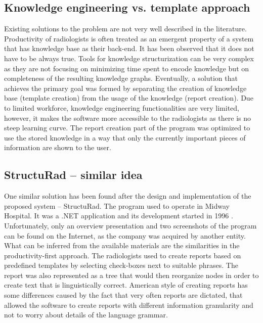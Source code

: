 \documentclass[12pt, twoside, openany]{report}
\theoremstyle{definition}
\begin{document}
\subsection{Knowledge engineering vs. template approach}
Existing solutions to the problem are not very well described in the literature. Productivity of radiologists is often treated as an emergent property of a system that has knowledge base as their back-end. It has been observed that it does not have to be always true. Tools for knowledge structurization can be very complex as they are not focusing on minimizing time spent to encode knowledge but on completeness of the resulting knowledge graphs. 
Eventually, a solution that achieves the primary goal was formed by separating the creation of knowledge base (template creation) from the usage of the knowledge (report creation). Due to limited workforce, knowledge engineering functionalities are very limited, however, it makes the software more accessible to the radiologists as there is no steep learning curve. The report creation part of the program was optimized to use the stored knowledge in a way that only the currently important pieces of information are shown to the user.
\subsection{StructuRad – similar idea} 
One similar solution has been found after the design and implementation of the proposed system – StructuRad. The program used to operate in Midway Hospital. It was a .NET application and its development started in 1996 \cite{structurad}. Unfortunately, only an overview presentation and two screenshots of the program can be found on the Internet, as the company was acquired by another entity. What can be inferred from the available materials are the similarities in the productivity-first approach. The radiologists used to create reports based on predefined templates by selecting check-boxes next to suitable phrases. The report was also represented as a tree that would then reorganize nodes in order to create text that is linguistically correct. American style of creating reports has some differences caused by the fact that very often reports are dictated, that allowed the software to create reports with different information granularity and not to worry about details of the language grammar.
\end{document}
